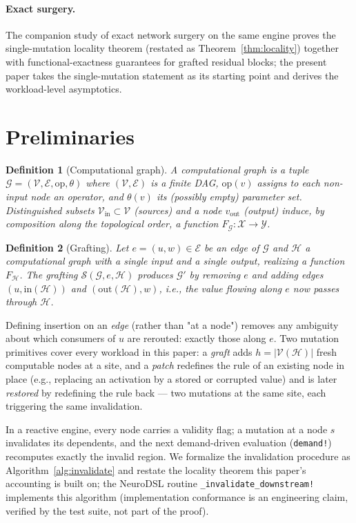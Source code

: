 \documentclass[11pt,a4paper]{article}
\newtheorem{definition}{Definition}
\newcommand{\G}{\mathcal{G}}
\newcommand{\Gp}{\mathcal{G}'}
\newcommand{\Hb}{\mathcal{H}}
\newcommand{\V}{\mathcal{V}}
\newcommand{\E}{\mathcal{E}}
\newcommand{\Surg}{\mathcal{S}}
\begin{document}
\paragraph{Exact surgery.} The companion study of exact network surgery on the same engine \cite{surgery} proves the single-mutation locality theorem (restated as Theorem~\ref{thm:locality}) together with functional-exactness guarantees for grafted residual blocks; the present paper takes the single-mutation statement as its starting point and derives the workload-level asymptotics.

\section{Preliminaries}
\label{sec:prelim}

\begin{definition}[Computational graph]
A computational graph is a tuple $\G = (\V, \E, \mathrm{op}, \theta)$ where $(\V, \E)$ is a finite DAG, $\mathrm{op}(v)$ assigns to each non-input node an operator, and $\theta(v)$ its (possibly empty) parameter set. Distinguished subsets $\V_{\mathrm{in}} \subset \V$ (sources) and a node $v_{\mathrm{out}}$ (output) induce, by composition along the topological order, a function $F_{\G} : \mathcal{X} \to \mathcal{Y}$.
\end{definition}

\begin{definition}[Grafting]
Let $e = (u, w) \in \E$ be an edge of $\G$ and $\Hb$ a computational graph with a single input and a single output, realizing a function $F_{\Hb}$. The grafting $\Surg(\G, e, \Hb)$ produces $\Gp$ by removing $e$ and adding edges $(u, \mathrm{in}(\Hb))$ and $(\mathrm{out}(\Hb), w)$, i.e., the value flowing along $e$ now passes through $\Hb$.
\end{definition}

Defining insertion on an \emph{edge} (rather than "at a node") removes any ambiguity about which consumers of $u$ are rerouted: exactly those along $e$. Two mutation primitives cover every workload in this paper: a \emph{graft} adds $h = |\V(\Hb)|$ fresh computable nodes at a site, and a \emph{patch} redefines the rule of an existing node in place (e.g., replacing an activation by a stored or corrupted value) and is later \emph{restored} by redefining the rule back --- two mutations at the same site, each triggering the same invalidation.

In a reactive engine, every node carries a validity flag; a mutation at a node $s$ invalidates its dependents, and the next demand-driven evaluation (\texttt{demand!}) recomputes exactly the invalid region. We formalize the invalidation procedure as Algorithm~\ref{alg:invalidate} and restate the locality theorem this paper's accounting is built on; the NeuroDSL routine \texttt{\_invalidate\_downstream!} implements this algorithm (implementation conformance is an engineering claim, verified by the test suite, not part of the proof).
\end{document}
